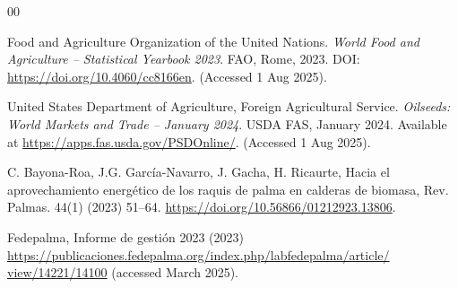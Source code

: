 \documentclass[preprint,12pt]{elsarticle}
\begin{document}
{%






\begin{thebibliography}{00}


Food and Agriculture Organization of the United Nations.
\textit{World Food and Agriculture – Statistical Yearbook 2023}.
FAO, Rome, 2023.
DOI: \href{https://doi.org/10.4060/cc8166en}{https://doi.org/10.4060/cc8166en}.
(Accessed 1 Aug 2025).

United States Department of Agriculture, Foreign Agricultural Service.
\textit{Oilseeds: World Markets and Trade – January 2024}.
USDA FAS, January 2024.
Available at
\href{https://apps.fas.usda.gov/PSDOnline/}{https://apps.fas.usda.gov/PSDOnline/}.
(Accessed 1 Aug 2025).



 C. Bayona-Roa, J.G. García-Navarro, J. Gacha, H. Ricaurte, Hacia el aprovechamiento energético de los raquis de palma en calderas de biomasa, Rev. Palmas. 44(1) (2023) 51--64. \href{https://doi.org/10.56866/01212923.13806}{https://doi.org/10.56866/01212923.13806}.




Fedepalma, Informe de gestión 2023 (2023)
\href{https://publicaciones.fedepalma.org/index.php/labfedepalma/article/view/14221/14100}
{https://publicaciones.fedepalma.org/index.php/labfedepalma/article/\\view/14221/14100}
(accessed March 2025).


\end{thebibliography}}
\end{document}

